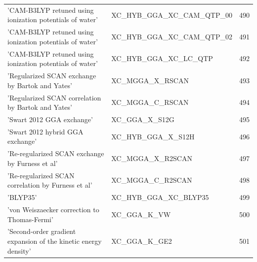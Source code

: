 \documentclass[final,12pt,makeidx,DIV=calc]{article}
\begin{document}
{{{\begin{table}[!h]
\begin{center}
\begin{tabular}{llr}
  'CAM-B3LYP retuned using ionization potentials of water' & XC\_HYB\_GGA\_XC\_CAM\_QTP\_00  &490\\
  'CAM-B3LYP retuned using ionization potentials of water' & XC\_HYB\_GGA\_XC\_CAM\_QTP\_02  &491\\
  'CAM-B3LYP retuned using ionization potentials of water' & XC\_HYB\_GGA\_XC\_LC\_QTP  &492\\
  'Regularized SCAN exchange by Bartok and Yates' & XC\_MGGA\_X\_RSCAN  &493\\
  'Regularized SCAN correlation by Bartok and Yates' & XC\_MGGA\_C\_RSCAN  &494\\
  'Swart 2012 GGA exchange' & XC\_GGA\_X\_S12G  &495\\
  'Swart 2012 hybrid GGA exchange' & XC\_HYB\_GGA\_X\_S12H  &496\\
  'Re-regularized SCAN exchange by Furness et al' & XC\_MGGA\_X\_R2SCAN  &497\\
  'Re-regularized SCAN correlation by Furness et al' & XC\_MGGA\_C\_R2SCAN  &498\\
  'BLYP35' & XC\_HYB\_GGA\_XC\_BLYP35  &499\\
  'von Weiszaecker correction to Thomas-Fermi' & XC\_GGA\_K\_VW  &500\\
  'Second-order gradient expansion of the kinetic energy density' & XC\_GGA\_K\_GE2  &501\\
\end{tabular}
\end{center}
\end{table}

}}}
\end{document}
